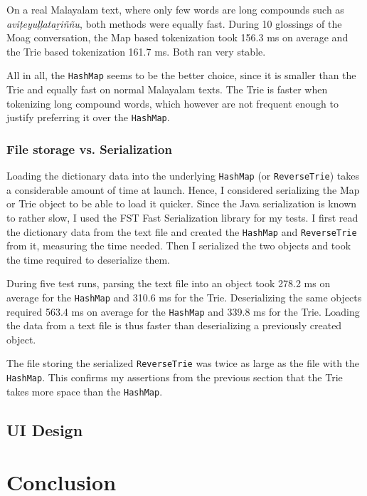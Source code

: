 \documentclass[a4paper]{article}
\newcommand{\typ}[1]{\texttt{#1}}
\begin{document}
On a real Malayalam text, where only few words are long compounds such as \textit{aviṭeyuḷḷataṟiññu}, both methods were equally fast. During 10 glossings of the Moag conversation, the Map based tokenization took 156.3 ms on average and the Trie based tokenization 161.7 ms. Both ran very stable.

All in all, the \typ{HashMap} seems to be the better choice, since it is smaller than the Trie and equally fast on normal Malayalam texts. The Trie is faster when tokenizing long compound words, which however are not frequent enough to justify preferring it over the \typ{HashMap}.

\subsubsection*{File storage vs. Serialization}

Loading the dictionary data into the underlying \typ{HashMap} (or \typ{ReverseTrie}) takes a considerable amount of time at launch. Hence, I considered serializing the Map or Trie object to be able to load it quicker. Since the Java serialization is known to rather slow, I used the FST Fast Serialization library for my tests. I first read the dictionary data from the text file and created the \typ{HashMap} and \typ{ReverseTrie} from it, measuring the time needed. Then I serialized the two objects and took the time required to deserialize them.

During five test runs, parsing the text file into an object took 278.2 ms on average for the \typ{HashMap} and 310.6 ms for the Trie. Deserializing the same objects required 563.4 ms on average for the \typ{HashMap} and 339.8 ms for the Trie. Loading the data from a text file is thus faster than deserializing a previously created object.

The file storing the serialized \typ{ReverseTrie} was twice as large as the file with the \typ{HashMap}. This confirms my assertions from the previous section that the Trie takes more space than the \typ{HashMap}.


\subsection{UI Design}

\section{Conclusion}

\nocite{*}
\printbibliography
\end{document}
